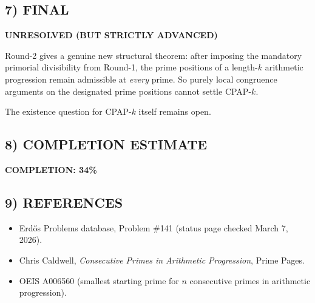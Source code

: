 \subsection*{7) FINAL}
\textbf{UNRESOLVED (BUT STRICTLY ADVANCED)}

Round-2 gives a genuine new structural theorem: after imposing the mandatory primorial divisibility from Round-1, the prime positions of a length-$k$ arithmetic progression remain admissible at \emph{every} prime.  So purely local congruence arguments on the designated prime positions cannot settle CPAP-$k$.

The existence question for CPAP-$k$ itself remains open.

\subsection*{8) COMPLETION ESTIMATE}
\textbf{COMPLETION: 34\%}

\subsection*{9) REFERENCES}
\begin{itemize}
\item Erd\H{o}s Problems database, Problem \#141 (status page checked March 7, 2026).
\item Chris Caldwell, \emph{Consecutive Primes in Arithmetic Progression}, Prime Pages.
\item OEIS A006560 (smallest starting prime for $n$ consecutive primes in arithmetic progression).
\end{itemize}

